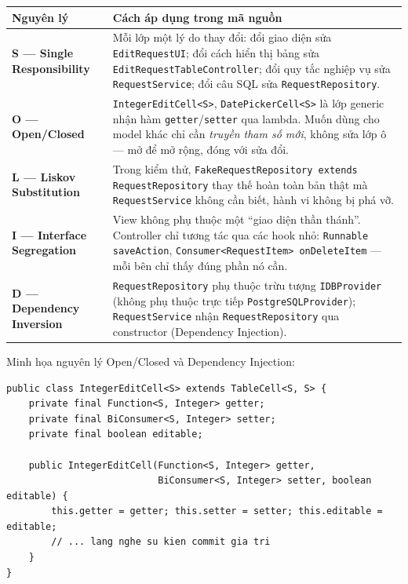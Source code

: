 \documentclass[12pt,a4paper]{article}
\begin{document}
\begin{longtable}{>{\bfseries}p{2.6cm} p{12.4cm}}
\hline
\rowcolor{gray!15}
\normalfont\textbf{Nguyên lý} & \textbf{Cách áp dụng trong mã nguồn} \\
\hline
\endhead
S --- Single Responsibility &
Mỗi lớp một lý do thay đổi: đổi giao diện sửa \texttt{EditRequestUI}; đổi cách
hiển thị bảng sửa \texttt{EditRequestTableController}; đổi quy tắc nghiệp vụ sửa
\texttt{RequestService}; đổi câu SQL sửa \texttt{RequestRepository}. \\
\hline
O --- Open/Closed &
\texttt{IntegerEditCell<S>}, \texttt{DatePickerCell<S>} là lớp generic nhận
hàm \texttt{getter}/\texttt{setter} qua lambda. Muốn dùng cho model khác chỉ cần
\emph{truyền tham số mới}, không sửa lớp ô --- mở để mở rộng, đóng với sửa đổi. \\
\hline
L --- Liskov Substitution &
Trong kiểm thử, \texttt{FakeRequestRepository extends RequestRepository} thay
thế hoàn toàn bản thật mà \texttt{RequestService} không cần biết, hành vi không
bị phá vỡ. \\
\hline
I --- Interface Segregation &
View không phụ thuộc một ``giao diện thần thánh''. Controller chỉ tương tác qua
các hook nhỏ: \texttt{Runnable saveAction}, \texttt{Consumer<RequestItem>
onDeleteItem} --- mỗi bên chỉ thấy đúng phần nó cần. \\
\hline
D --- Dependency Inversion &
\texttt{RequestRepository} phụ thuộc trừu tượng \texttt{IDBProvider} (không phụ
thuộc trực tiếp \texttt{PostgreSQLProvider}); \texttt{RequestService} nhận
\texttt{RequestRepository} qua constructor (Dependency Injection). \\
\hline
\end{longtable}

\noindent Minh họa nguyên lý Open/Closed và Dependency Injection:

\begin{lstlisting}[caption={Ô chỉnh sửa số nguyên dùng chung (generic, theo OCP)}]
public class IntegerEditCell<S> extends TableCell<S, S> {
    private final Function<S, Integer> getter;
    private final BiConsumer<S, Integer> setter;
    private final boolean editable;

    public IntegerEditCell(Function<S, Integer> getter,
                           BiConsumer<S, Integer> setter, boolean editable) {
        this.getter = getter; this.setter = setter; this.editable = editable;
        // ... lang nghe su kien commit gia tri
    }
}
\end{lstlisting}
\end{document}
